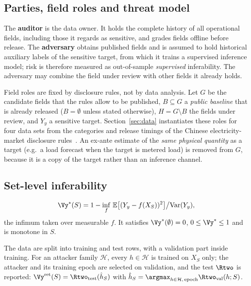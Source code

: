 \subsection{Parties, field roles and threat model}
The \textbf{auditor} is the data owner. It holds the complete history of all operational
fields, including those it regards as sensitive, and grades fields offline before release.
The \textbf{adversary} obtains published fields and is assumed to hold historical auxiliary
labels of the sensitive target, from which it trains a supervised inference model; risk is
therefore measured as out-of-sample \emph{supervised} inferability. The adversary may combine
the field under review with other fields it already holds.

Field roles are fixed by disclosure rules, not by data analysis. Let $G$ be the candidate
fields that the rules allow to be published, $B\subseteq G$ a \emph{public baseline} that is
already released ($B=\emptyset$ unless stated otherwise), $H=G\setminus B$ the fields under
review, and $Y_y$ a sensitive target. Section~\ref{sec:data} instantiates these roles for
four data sets from the categories and release timings of the Chinese electricity-market
disclosure rules~\cite{nea2024disclosure}. An ex-ante estimate of the \emph{same physical
quantity} as a target (e.g.\ a load forecast when the target is metered load) is removed from
$G$, because it is a copy of the target rather than an inference channel.

\subsection{Set-level inferability}
\begin{definition}
\[
\Vy^{*}(S) = 1 - \inf_{f}\,\mathbb{E}\big[(Y_y - f(X_S))^{2}\big] \big/ \mathrm{Var}(Y_y),
\]
the infimum taken over measurable $f$. It satisfies $\Vy^{*}(\emptyset)=0$, $0 \le \Vy^{*} \le 1$
and is monotone in $S$.
\end{definition}

\begin{definition}\label{def:vret}
The data are split into training and test rows, with a validation part inside training. For
an attacker family $\mathcal{H}$, every $h\in\mathcal{H}$ is trained on $X_S$ only; the
attacker and its training epoch are selected on validation, and the test $\Rtwo$ is reported:
$\Vy^{\mathrm{ret}}(S) = \Rtwo_{\mathrm{test}}(\hat h_S)$ with
$\hat h_S = \argmax_{h \in \mathcal{H},\,\mathrm{epoch}} \Rtwo_{\mathrm{val}}(h;S)$.
\end{definition}

